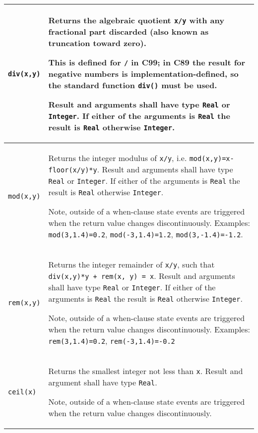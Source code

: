 \begin{longtable}{|p{2cm}|p{12cm}|} \hline
\endhead
\lstinline!div(x,y)! & Returns the algebraic quotient \lstinline!x/y! with any fractional part
discarded (also known as truncation toward zero).
\begin{nonnormative}
This is defined for \lstinline!/! in C99; in C89 the result for negative numbers is implementation-defined, so the standard function \lstinline!div()! must be used.
\end{nonnormative}
Result and arguments shall have type \lstinline!Real! or \lstinline!Integer!. If
either of the arguments is \lstinline!Real! the result is \lstinline!Real! otherwise
\lstinline!Integer!.\\ \hline
\lstinline!mod(x,y)! & Returns the integer modulus of \lstinline!x/y!, i.e.
\lstinline!mod(x,y)=x-floor(x/y)*y!. Result and arguments shall have type \lstinline!Real! or
\lstinline!Integer!. If either of the arguments is \lstinline!Real! the result is \lstinline!Real! otherwise
\lstinline!Integer!.
\par
\begin{nonnormative*}
Note, outside of a when-clause state events are triggered when the return value changes discontinuously. Examples:
\lstinline!mod(3,1.4)=0.2!, \lstinline!mod(-3,1.4)=1.2!, \lstinline!mod(3,-1.4)=-1.2!.
\end{nonnormative*}
\\ \hline
\lstinline!rem(x,y)! & Returns the integer remainder of \lstinline!x/y!, such that \lstinline!div(x,y)*y + rem(x, y) = x!. Result and arguments shall have type \lstinline!Real! or \lstinline!Integer!. If
either of the arguments is \lstinline!Real! the result is \lstinline!Real! otherwise \lstinline!Integer!.
\par
\begin{nonnormative*}
Note, outside of a when-clause state events are triggered when the return value changes discontinuously. Examples:
\lstinline!rem(3,1.4)=0.2!, \lstinline!rem(-3,1.4)=-0.2!
\end{nonnormative*}
\\ \hline
\lstinline!ceil(x)! & Returns the smallest integer not less than \lstinline!x!. Result and
argument shall have type \lstinline!Real!.
\par
\begin{nonnormative*}
Note, outside of a when-clause state events are triggered when the return value changes discontinuously.
\end{nonnormative*}
\\ \hline

\end{longtable}
